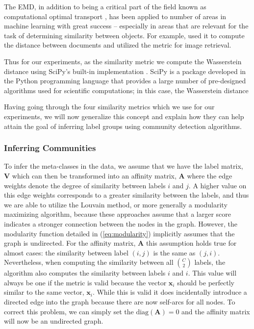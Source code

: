 \documentclass[../thesis.tex]{subfiles}
\begin{document}
The EMD, in addition to being a critical part of the field known as computational optimal transport \cite{peyre2019computational}, has been applied to number of areas in machine learning with great success -- especially in areas that are relevant for the task of determining similarity between objects. For example, \cite{kusner2015word} used it to compute the distance between documents and \cite{rubner2000earth} utilized the metric for image retrieval. 

Thus for our experiments, as the similarity metric we compute the Wasserstein distance using SciPy's built-in implementation \cite{scipy}. SciPy is a package developed in the Python programming language that provides a large number of pre-designed algorithms used for scientific computations; in this case, the Wasserstein distance

Having going through the four similarity metrics which we use for our experiments, we will now generalize this concept and explain how they can help attain the goal of inferring label groups using community detection algorithms.

\subsubsection{Inferring Communities}
To infer the meta-classes in the data, we assume that we have the label matrix, $\mathbf{V}$ which can then be transformed into an affinity matrix, $\mathbf{A}$ where the edge weights denote the degree of similarity between labels $i$ and $j$. A higher value on this edge weights corresponds to a greater similarity between the labels, and thus we are able to utilize the Louvain method, or more generally a modularity maximizing algorithm, because these approaches assume that a larger score indicates a stronger connection between the nodes in the graph. However, the modularity function detailed in (\ref{eq:modularity}) implicitly assumes that the graph is undirected. For the affinity matrix, $\mathbf{A}$ this assumption holds true for almost cases: the similarity between label $(i, j)$ is the same as $(j, i)$. Nevertheless, when computing the similarity between all $\binom{C}{2}$ labels, the algorithm also computes the similarity between labels $i$ and $i$. This value will always be one if the metric is valid because the vector $\mathbf{x}_i$ should be perfectly similar to the same vector, $\mathbf{x}_i$. While this is valid it does incidentally introduce a directed edge into the graph because there are now self-arcs for all nodes. To correct this problem, we can simply set the $\text{diag}(\mathbf{A}) = 0$ and the affinity matrix will now be an undirected graph.
\end{document}
